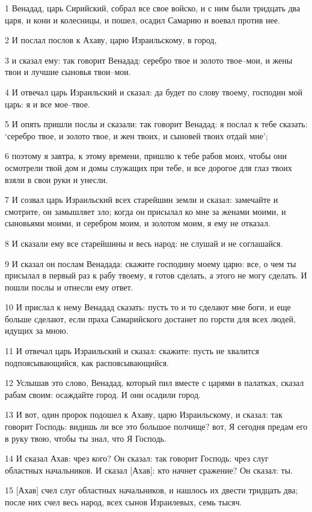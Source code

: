 \par 1 Венадад, царь Сирийский, собрал все свое войско, и с ним были тридцать два царя, и кони и колесницы, и пошел, осадил Самарию и воевал против нее.
\par 2 И послал послов к Ахаву, царю Израильскому, в город,
\par 3 и сказал ему: так говорит Венадад: серебро твое и золото твое--мои, и жены твои и лучшие сыновья твои--мои.
\par 4 И отвечал царь Израильский и сказал: да будет по слову твоему, господин мой царь: я и все мое--твое.
\par 5 И опять пришли послы и сказали: так говорит Венадад: я послал к тебе сказать: `серебро твое, и золото твое, и жен твоих, и сыновей твоих отдай мне';
\par 6 поэтому я завтра, к этому времени, пришлю к тебе рабов моих, чтобы они осмотрели твой дом и домы служащих при тебе, и все дорогое для глаз твоих взяли в свои руки и унесли.
\par 7 И созвал царь Израильский всех старейшин земли и сказал: замечайте и смотрите, он замышляет зло; когда он присылал ко мне за женами моими, и сыновьями моими, и серебром моим, и золотом моим, я ему не отказал.
\par 8 И сказали ему все старейшины и весь народ: не слушай и не соглашайся.
\par 9 И сказал он послам Венадада: скажите господину моему царю: все, о чем ты присылал в первый раз к рабу твоему, я готов сделать, а этого не могу сделать. И пошли послы и отнесли ему ответ.
\par 10 И прислал к нему Венадад сказать: пусть то и то сделают мне боги, и еще больше сделают, если праха Самарийского достанет по горсти для всех людей, идущих за мною.
\par 11 И отвечал царь Израильский и сказал: скажите: пусть не хвалится подпоясывающийся, как распоясывающийся.
\par 12 Услышав это слово, Венадад, который пил вместе с царями в палатках, сказал рабам своим: осаждайте город. И они осадили город.
\par 13 И вот, один пророк подошел к Ахаву, царю Израильскому, и сказал: так говорит Господь: видишь ли все это большое полчище? вот, Я сегодня предам его в руку твою, чтобы ты знал, что Я Господь.
\par 14 И сказал Ахав: чрез кого? Он сказал: так говорит Господь: чрез слуг областных начальников. И сказал [Ахав]: кто начнет сражение? Он сказал: ты.
\par 15 [Ахав] счел слуг областных начальников, и нашлось их двести тридцать два; после них счел весь народ, всех сынов Израилевых, семь тысяч.
